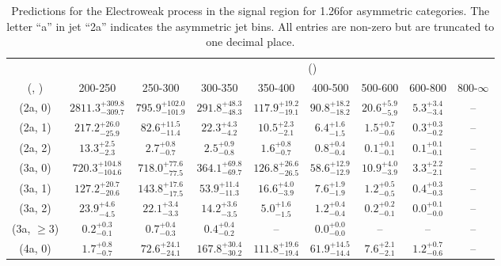 \begin{table}[h!]
\tiny
\centering
\caption{Predictions for the Electroweak process in the signal region for 1.26\ifb for asymmetric categories. The letter ``a'' in jet \eg ``2a''  indicates the asymmetric jet bins. All entries are non-zero but are truncated to one decimal place.\label{tab:predsep_sig_ewk_asym}}
\begin{tabular}
{ccccccccc}
	\hline\hline
&	& \multicolumn{8}{c}{\scalht (\gev)} \\ 
	 (\njet,  \nb) & 200-250 & 250-300 & 300-350 & 350-400 & 400-500 & 500-600 & 600-800 & 800-$\infty$ \\ [0.8ex] 
\hline
	(2a, 0) & $2811.3^{+ 309.8 }_{- 309.7 }$ & $795.9^{+ 102.0 }_{- 101.9 }$ & $291.8^{+ 48.3 }_{- 48.3 }$ & $117.9^{+ 19.2 }_{- 19.1 }$ & $90.8^{+ 18.2 }_{- 18.2 }$ & $20.6^{+ 5.9 }_{- 5.9 }$ & $5.3^{+ 3.4 }_{- 3.4 }$ & -- \\[0.5ex] 
	(2a, 1) & $217.2^{+ 26.0 }_{- 25.9 }$ & $82.6^{+ 11.5 }_{- 11.4 }$ & $22.3^{+ 4.3 }_{- 4.2 }$ & $10.5^{+ 2.3 }_{- 2.1 }$ & $6.4^{+ 1.6 }_{- 1.5 }$ & $1.5^{+ 0.7 }_{- 0.6 }$ & $0.3^{+ 0.3 }_{- 0.2 }$ & -- \\[0.5ex] 
	(2a, 2) & $13.3^{+ 2.5 }_{- 2.3 }$ & $2.7^{+ 0.8 }_{- 0.7 }$ & $2.5^{+ 0.9 }_{- 0.8 }$ & $1.6^{+ 0.8 }_{- 0.7 }$ & $0.8^{+ 0.4 }_{- 0.4 }$ & $0.1^{+ 0.1 }_{- 0.1 }$ & $0.1^{+ 0.1 }_{- 0.1 }$ & -- \\[0.5ex] 
	(3a, 0) & $720.3^{+ 104.8 }_{- 104.6 }$ & $718.0^{+ 77.6 }_{- 77.5 }$ & $364.1^{+ 69.8 }_{- 69.7 }$ & $126.8^{+ 26.6 }_{- 26.5 }$ & $58.6^{+ 12.9 }_{- 12.9 }$ & $10.9^{+ 4.0 }_{- 3.9 }$ & $3.3^{+ 2.2 }_{- 2.1 }$ & -- \\[0.5ex] 
	(3a, 1) & $127.2^{+ 20.7 }_{- 20.6 }$ & $143.8^{+ 17.6 }_{- 17.5 }$ & $53.9^{+ 11.4 }_{- 11.3 }$ & $16.6^{+ 4.0 }_{- 3.9 }$ & $7.6^{+ 1.9 }_{- 1.9 }$ & $1.2^{+ 0.5 }_{- 0.5 }$ & $0.4^{+ 0.3 }_{- 0.3 }$ & -- \\[0.5ex] 
	(3a, 2) & $23.9^{+ 4.6 }_{- 4.5 }$ & $22.1^{+ 3.4 }_{- 3.3 }$ & $14.2^{+ 3.6 }_{- 3.5 }$ & $5.0^{+ 1.6 }_{- 1.5 }$ & $1.2^{+ 0.4 }_{- 0.4 }$ & $0.2^{+ 0.2 }_{- 0.1 }$ & $0.0^{+ 0.1 }_{- 0.0 }$ & -- \\[0.5ex] 
	(3a, $\ge3$) & $0.2^{+ 0.3 }_{- 0.1 }$ & $0.7^{+ 0.4 }_{- 0.3 }$ & $0.4^{+ 0.4 }_{- 0.2 }$ & -- & $0.0^{+ 0.0 }_{- 0.0 }$ & -- & -- & -- \\[0.5ex] 
	(4a, 0) & $1.7^{+ 0.8 }_{- 0.7 }$ & $72.6^{+ 24.1 }_{- 24.1 }$ & $167.8^{+ 30.4 }_{- 30.2 }$ & $111.8^{+ 19.6 }_{- 19.4 }$ & $61.9^{+ 14.5 }_{- 14.4 }$ & $7.6^{+ 2.1 }_{- 2.1 }$ & $1.2^{+ 0.7 }_{- 0.6 }$ & -- \\[0.5ex] 

\end{tabular}
\end{table}
